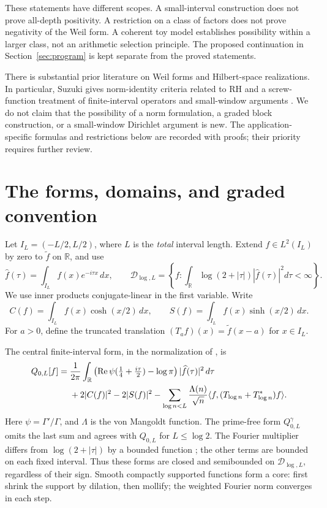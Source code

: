 \documentclass[11pt]{article}
\numberwithin{equation}{section}
\theoremstyle{definition}
\theoremstyle{remark}
\newcommand{\R}{\mathbb R}
\newcommand{\DD}{\mathcal D}
\newcommand{\ip}[2]{\langle#1,#2\rangle}
\newcommand{\Qgam}{Q^{\gamma}}
\DeclareMathOperator{\Rea}{Re}
\begin{document}
These statements have different scopes. A small-interval construction does
not prove all-depth positivity. A restriction on a class of factors does
not prove negativity of the Weil form. A coherent toy model establishes
possibility within a larger class, not an arithmetic selection principle.
The proposed continuation in Section~\ref{sec:program} is kept separate
from the proved statements.

There is substantial prior literature on Weil forms and Hilbert-space
realizations. In particular, Suzuki gives norm-identity criteria related to
RH \cite{SuzukiHilbert} and a screw-function treatment of finite-interval
operators and small-window arguments \cite{SuzukiScrew}. We do not claim that
the possibility of a norm formulation, a graded block construction, or a
small-window Dirichlet argument is new. The application-specific formulas
and restrictions below are recorded with proofs; their priority requires
further review.

\section{The forms, domains, and graded convention}
\label{sec:target}

Let $I_L=(-L/2,L/2)$, where $L$ is the \emph{total} interval length.
Extend $f\in L^2(I_L)$ by zero to $\widetilde f$ on $\R$, and use
\begin{equation}
\widehat f(\tau)=\int_{I_L}f(x)e^{-i\tau x}\,dx,
\qquad
\DD_{\log,L}=\left\{f:\int_\R\log(2+|\tau|)|\widehat f(\tau)|^2d\tau<\infty\right\}.
\end{equation}
We use inner products conjugate-linear in the first variable. Write
\begin{equation}
C(f)=\int_{I_L}f(x)\cosh(x/2)\,dx,
\qquad S(f)=\int_{I_L}f(x)\sinh(x/2)\,dx.
\end{equation}
For $a>0$, define the truncated translation
$(T_af)(x)=\widetilde f(x-a)$ for $x\in I_L$.

The central finite-interval form, in the normalization of
\cite{BakerWeil}, is
\begin{align}
Q_{0,L}[f]={}&\frac1{2\pi}\int_\R
\left(\Rea\psi(\tfrac14+\tfrac{i\tau}{2})-\log\pi\right)
|\widehat f(\tau)|^2\,d\tau\notag\\
&+2|C(f)|^2-2|S(f)|^2
-\sum_{\log n<L}\frac{\Lambda(n)}{\sqrt n}
\ip{f}{(T_{\log n}+T_{\log n}^*)f}.
\label{eq:weil}
\end{align}
Here $\psi=\Gamma'/\Gamma$, and $\Lambda$ is the von Mangoldt function.
The prime-free form $\Qgam_{0,L}$ omits the last sum and agrees with
$Q_{0,L}$ for $L\leq\log2$. The Fourier multiplier differs from
$\log(2+|\tau|)$ by a bounded function \cite{DLMF}; the other terms are
bounded on each fixed interval. Thus these forms are closed and semibounded
on $\DD_{\log,L}$, regardless of their sign. Smooth compactly supported
functions form a core: first shrink the support by dilation, then mollify;
the weighted Fourier norm converges in each step.
\end{document}
